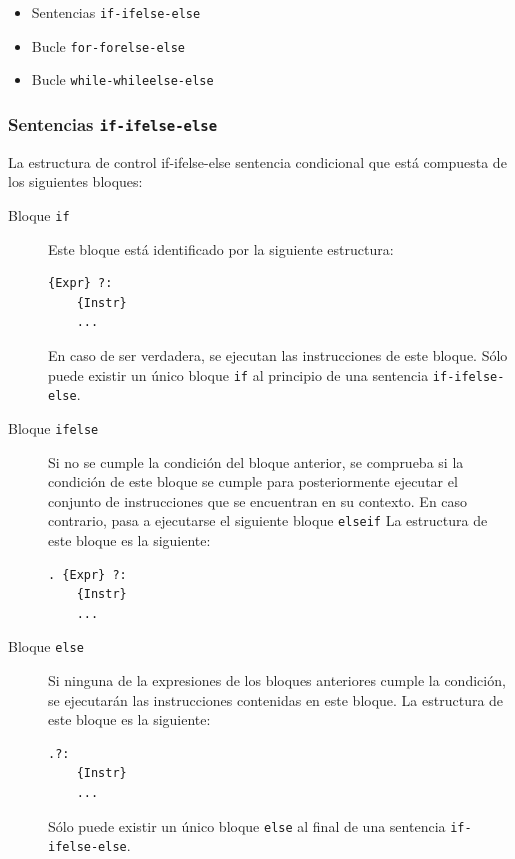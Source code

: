 \documentclass[11pt, english]{article}
\begin{document}
\begin{itemize}
	\item Sentencias \texttt{if-ifelse-else}
	\item Bucle \texttt{for-forelse-else}
	\item Bucle \texttt{while-whileelse-else}
\end{itemize}

\subsubsection{Sentencias \texttt{if-ifelse-else}}
La estructura de control if-ifelse-else sentencia condicional que está compuesta de los siguientes bloques:
\begin{description}
	\item[Bloque \texttt{if}] Este bloque está identificado por la siguiente estructura:
	\begin{center}
\begin{lstlisting}
{Expr} ?:
	{Instr}
	...
\end{lstlisting}
	\end{center}
	En caso de ser verdadera, se ejecutan las instrucciones de este bloque. Sólo puede existir un único bloque \texttt{if} al principio de una sentencia \texttt{if-ifelse-else}.
	\item[Bloque \texttt{ifelse}] Si no se cumple la condición del bloque anterior, se comprueba si la condición de este bloque se cumple para posteriormente ejecutar el conjunto de instrucciones que se encuentran en su contexto. En caso contrario, pasa a ejecutarse el siguiente bloque \texttt{elseif} La estructura de este bloque es la siguiente:
	\begin{center}
\begin{lstlisting}
. {Expr} ?:
	{Instr}
	...
\end{lstlisting}
	\end{center}
	\item[Bloque \texttt{else}] Si ninguna de la expresiones de los bloques anteriores cumple la condición, se ejecutarán las instrucciones contenidas en este bloque. La estructura de este bloque es la siguiente:
	\begin{center}
\begin{lstlisting}
.?:
	{Instr}
	...
\end{lstlisting}
	\end{center}
	Sólo puede existir un único bloque \texttt{else} al final de una sentencia \texttt{if-ifelse-else}.
\end{description}
\end{document}
